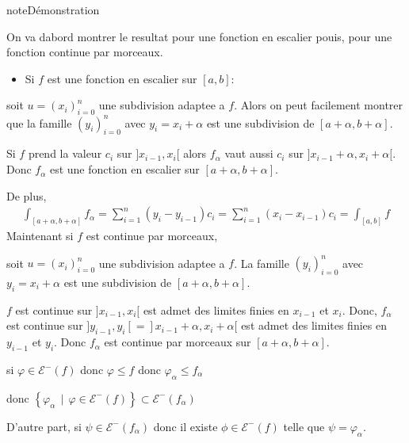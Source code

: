 \documentclass[letterpaper,10pt,french]{jupyterBook}
\begin{document}
\begin{sphinxadmonition}{note}{Démonstration}

\sphinxAtStartPar
On va dabord montrer le resultat pour une fonction en escalier pouis, pour une fonction continue par morceaux.
\begin{itemize}
\item {} 
\sphinxAtStartPar
Si \(f\) est une fonction en escalier sur \([a, b]\):

\end{itemize}

\sphinxAtStartPar
soit \(u=(x_i)_{i=0}^n\) une subdivision adaptee a \(f\). Alors on peut facilement montrer que la famille \((y_i)_{i=0}^n\) avec \(y_i = x_i +\alpha\) est une subdivision de \([a+\alpha, b+\alpha]\).

\sphinxAtStartPar
Si \(f\) prend la valeur \(c_i\) sur \(]x_{i-1}, x_i[\) alors \(f_\alpha\) vaut aussi \(c_i\) sur \(]x_{i-1}+\alpha,  x_i+\alpha[\). Donc \(f_\alpha\) est une fonction en escalier sur \([a+\alpha, b+\alpha]\).

\sphinxAtStartPar
De plus,
\begin{equation*}
\begin{split}
\int_{[a+\alpha, b+\alpha]} f_\alpha = \sum_{i=1}^n (y_i - y_{i-1})c_i = \sum_{i=1}^n (x_i - x_{i-1})c_i = \int_{[a, b]} f
\end{split}
\end{equation*}
\sphinxAtStartPar
Maintenant si \(f\) est continue par morceaux,

\sphinxAtStartPar
soit \(u=(x_i)_{i=0}^n\) une subdivision adaptee a \(f\). La famille \((y_i)_{i=0}^n\) avec \(y_i = x_i +\alpha\) est une subdivision de \([a+\alpha, b+\alpha]\).

\sphinxAtStartPar
\(f\) est continue sur \(]x_{i-1}, x_i[\) est admet des limites finies en \(x_{i-1}\) et \(x_{i}\). Donc, \(f_\alpha\) est continue sur \(]y_{i-1}, y_i[=]x_{i-1}+\alpha, x_i+\alpha[\) est admet des limites finies en \(y_{i-1}\) et \(y_{i}\). Donc  \(f_\alpha\) est continue par morceaux sur \([a+\alpha, b+\alpha]\).

\sphinxAtStartPar
si \(\varphi \in \mathcal E^-(f)\) donc \(\varphi \leq f\) donc \(\varphi_\alpha  \leq f_\alpha\)

\sphinxAtStartPar
donc \(\left\{\varphi_\alpha ~~ | ~~ \varphi \in \mathcal E^-(f) \right\} \subset \mathcal E^-(f_\alpha)\)

\sphinxAtStartPar
D’autre part, si \(\psi \in  \mathcal E^-(f_\alpha)\) donc il existe \(\phi \in  \mathcal E^-(f)\) telle que \(\psi = \varphi_\alpha\).


\end{sphinxadmonition}
\end{document}
